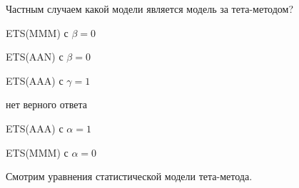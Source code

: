 
\begin{question}
Частным случаем какой модели является модель за тета-методом?
\begin{answerlist}
  \item ETS(MMM) с \(\beta=0\)
  \item ETS(AAN) с \(\beta=0\)
  \item ETS(AAA) с \(\gamma=1\)
  \item нет верного ответа
  \item ETS(AAA) с \(\alpha=1\)
  \item ETS(MMM) с \(\alpha=0\)
\end{answerlist}
\end{question}

\begin{solution}
Смотрим уравнения статистической модели тета-метода.
\end{solution}


